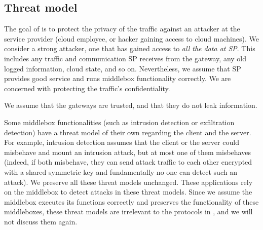 







\subsection{Threat model}

The goal of \sys is to protect the privacy of the traffic against an attacker at the service provider  
(cloud employee, or hacker gaining access to cloud machines). 
We consider a strong  attacker, one that has gained access to {\em all the data at SP}.
This includes any traffic and communication SP receives from the 
gateway, any old logged information, cloud state, and so on. Nevertheless, we assume that 
SP provides good service and runs middlebox functionality correctly.  We are concerned with 
protecting  the traffic's confidentiality.

We assume that the gateways are trusted, and that they do not leak information.


Some middlebox functionalities (such as intrusion detection or exfiltration detection) have a threat model
of their own regarding the client and the server. For example, intrusion detection assumes that 
the client or the server could misbehave and mount an intrusion attack, but at most one of them misbehaves~\cite{Bro}  
(indeed, if both misbehave, they can send attack traffic to each other encrypted with a shared symmetric key and fundamentally
no one can detect such an attack).  We preserve all these threat models unchanged. These applications rely
on the middlebox to detect attacks in these threat models. Since we assume the middlebox executes
its functions correctly and \sys preserves the functionality of these middleboxes, 
these threat models are irrelevant to the protocols in \sys, and we will not discuss them again. 


